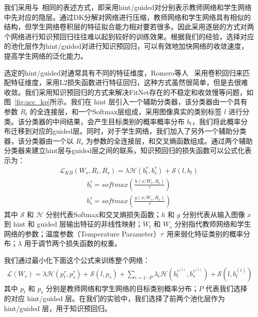 我们采用与~\cite{romero2014fitnets}相同的表述方式，即采用hint/guided对分别表示教师网络和学生网络中先对应的隐层。通过DK分解对网络进行压缩，教师网络和学生网络具有相似的结构，但学生网络卷积层的特征拟合能力相对要若很多。因此采用逐层的方式对两个网络进行知识预回归往往难以起到较好的训练效果。根据我们的经验，选择对应的池化层作为hint/guided对进行知识预回归，可以有效地加快网络的收敛速度，提高学生网络的泛化能力。

选定的hint/guided对通常具有不同的特征维度，Romero等人~\cite{romero2014fitnets} 采用卷积回归来匹配特征维度，采用L2损失函数进行特征回归，这种方式虽然很简单，但是去很难收敛。我们采用知识预回归的方式来解决FitNet存在的不稳定和收敛慢等问题，如图~\ref{fig:acc_kp}所示。我们在 hint 层引入一个辅助分类器，该分类器由一个具有参数 $R_t$ 的全连接层，和一个Softmax层组成，采用图像真实的类别标签 $l$ 进行分类。该分类器的中间结果，会产生目标类别的概率概率分布 $b_t$，我们将此概率分布迁移到对应的guided层。同时，对于学生网络，我们加入了另外一个辅助分类器，该分类器由一个以 $R_s$ 为参数的全连接层，和交叉熵函数组成。通过两个辅助分类器来建立hint层与guided层之间的联系，知识预回归的损失函数可以公式化表示为：
\begin{align} \label{equ:bridge}
\mathcal{L}_{KB}(W_s, R_t, R_s)={\lambda}\mathcal{H}(b_t^{\tau}, b_s^{\tau})+\mathcal{S}(l, b_t)
\end{align}
\begin{align} \label{equ:bt}
b_t^{\tau}=\mathit{softmax}(\frac{h(x; W_t, R_t)}{\tau})
\end{align}
\begin{align} \label{equ:bs}
b_s^{\tau}=\mathit{softmax}(\frac{g(x; W_s, R_s)}{\tau})
\end{align}
其中 $\mathcal{S}$ 和 $\mathcal{H}$ 分别代表Softmax和交叉熵损失函数；$h$ 和 $g$ 分别代表从输入图像 $x$ 到 hint 和 guided 层输出特征的非线性映射；$W_t$ 和 $W_s$ 分别指代教师网络和学生网络的参数；温度参数（Temperature Parameter）$\tau$~\cite{hinton2015distilling}用来弱化特征类别的概率分布；${\lambda}$ 用于调节两个损失函数的权重。

我们通过最小化下面这个公式来训练整个网络：
\begin{align} \label{equ:all}
\mathcal{L}(W_s)={\lambda}\mathcal{H}(p_t^{\tau}, p_s^{\tau}) + \mathcal{S}(l, p_s) + \sum_{i=1{\cdots}P}{\lambda}_i\mathcal{H}(b_t^{\tau^{(i)}}, b_s^{\tau^{(i)}})+\mathcal{S}(l, b_t^{(i)})
\end{align}
其中 $p_t$ 和 $p_s$ 分别是教师网络和学生网络的目标类别概率分布；$P$ 代表我们选择的对应 hint/guided 层。在我们的实验中，我们选择了前两个池化层作为 hint/guided 层，用于知识预回归。

